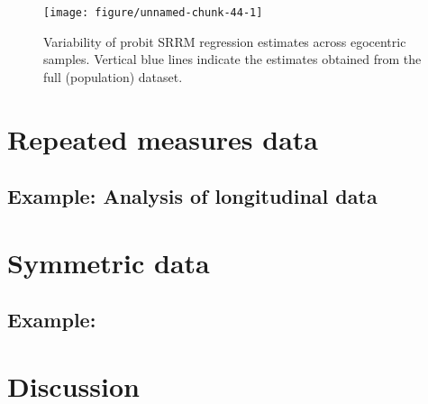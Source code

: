 \documentclass[11pt]{article}\usepackage[]{graphicx}\usepackage[]{color}
\makeatletter
\def\maxwidth{ %
  \ifdim\Gin@nat@width>\linewidth
    \linewidth
  \else
    \Gin@nat@width
  \fi
}
\newenvironment{knitrout}{}{} %
\makeatother
\begin{document}
\begin{figure}
\begin{knitrout}\footnotesize
{}\color{fgcolor}

{\centering \texttt{[image: figure/unnamed-chunk-44-1]} 

}



\end{knitrout}
\caption{Variability of probit SRRM regression estimates across 
egocentric samples. Vertical blue  lines indicate the estimates 
obtained from the full (population) dataset. }
\label{fig:ess_betas}
\end{figure}







\section{Repeated measures data}

\subsection{Example: Analysis of longitudinal data}

\section{Symmetric data}

\subsection{Example: }


\section{Discussion} 



\end{document}
